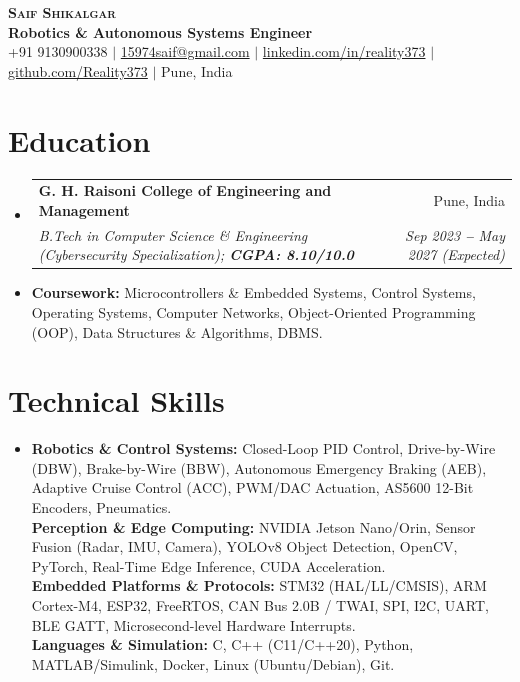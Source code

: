\documentclass[letterpaper,9pt]{extarticle}
\makeatletter
\newcommand{\resumeSubheading}[4]{
  \vspace{-2pt}\item
    \begin{tabular*}{\linewidth}[t]{l@{\extracolsep{\fill}}r}
      \textbf{#1} & #2 \\
      \textit{\small#3} & \textit{\small #4} \\
    \end{tabular*}\vspace{-5pt}
}
\newcommand{\resumeSubHeadingListStart}{\begin{itemize}[leftmargin=0.08in, label={}]}
\newcommand{\resumeSubHeadingListEnd}{\end{itemize}\vspace{-5pt}}
\makeatother
\begin{document}
\begin{center}
    \textbf{\LARGE \scshape Saif Shikalgar} \\ \vspace{2pt}
    \small
    \textbf{Robotics \& Autonomous Systems Engineer} \\ \vspace{1.5pt}
    +91 9130900338
    $|$
    \href{mailto:15974saif@gmail.com}{15974saif@gmail.com}
    $|$
    \href{https://www.linkedin.com/in/reality373}{linkedin.com/in/reality373}
    $|$
    \href{https://github.com/Reality373}{github.com/Reality373}
    $|$
    Pune, India
\end{center}
\vspace{-6pt}

\section{Education}
  \vspace{1pt}
  \resumeSubHeadingListStart
    \resumeSubheading
      {G. H. Raisoni College of Engineering and Management}{Pune, India}
      {B.Tech in Computer Science \& Engineering (Cybersecurity Specialization); \textbf{CGPA: 8.10/10.0}}{Sep 2023 \textbf{--} May 2027 (Expected)}
      \vspace{-2pt}
      \item{
        \small{\textbf{Coursework:} Microcontrollers \& Embedded Systems, Control Systems, Operating Systems, Computer Networks, Object-Oriented Programming (OOP), Data Structures \& Algorithms, DBMS.}
      }
  \resumeSubHeadingListEnd

\section{Technical Skills}
  \vspace{1pt}
  \resumeSubHeadingListStart
    \item{
        \small{\textbf{Robotics \& Control Systems:}{ Closed-Loop PID Control, Drive-by-Wire (DBW), Brake-by-Wire (BBW), Autonomous Emergency Braking (AEB), Adaptive Cruise Control (ACC), PWM/DAC Actuation, AS5600 12-Bit Encoders, Pneumatics.}} \\ \vspace{1.5pt}
        \small{\textbf{Perception \& Edge Computing:}{ NVIDIA Jetson Nano/Orin, Sensor Fusion (Radar, IMU, Camera), YOLOv8 Object Detection, OpenCV, PyTorch, Real-Time Edge Inference, CUDA Acceleration.}} \\ \vspace{1.5pt}
        \small{\textbf{Embedded Platforms \& Protocols:}{ STM32 (HAL/LL/CMSIS), ARM Cortex-M4, ESP32, FreeRTOS, CAN Bus 2.0B / TWAI, SPI, I2C, UART, BLE GATT, Microsecond-level Hardware Interrupts.}} \\ \vspace{1.5pt}
        \small{\textbf{Languages \& Simulation:}{ C, C++ (C11/C++20), Python, MATLAB/Simulink, Docker, Linux (Ubuntu/Debian), Git.}}
    }
  \resumeSubHeadingListEnd
\end{document}
